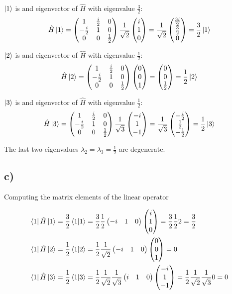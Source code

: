 \documentclass{article}
\newcommand*\colvec[3][]{
    \begin{pmatrix}\ifx\relax#1\relax\else#1\\\fi#2\\#3\end{pmatrix}
}
\begin{document}
$\ket{1}$ is and eigenvector of $\hat{H}$ with eigenvalue $\frac{3}{2}$:
\begin{equation}
\hat{H}\ket{1} = 
\begin{pmatrix}
1 & \frac{i}{2} & 0 \\
-\frac{i}{2} & 1 & 0 \\
0 & 0 & \frac{1}{2}
\end{pmatrix}
\frac{1}{\sqrt{2}}\colvec[i]{1}{0} =
\frac{1}{\sqrt{2}}\colvec[\frac{3i}{2}]{\frac{3}{2}}{0} =
\frac{3}{2}\ket{1}
\end{equation}

$\ket{2}$ is and eigenvector of $\hat{H}$ with eigenvalue $\frac{1}{2}$:
\begin{equation}
\hat{H}\ket{2} = 
\begin{pmatrix}
1 & \frac{i}{2} & 0 \\
-\frac{i}{2} & 1 & 0 \\
0 & 0 & \frac{1}{2}
\end{pmatrix}
\colvec[0]{0}{1} =
\colvec[0]{0}{\frac{1}{2}} =
\frac{1}{2}\ket{2}
\end{equation}

$\ket{3}$ is and eigenvector of $\hat{H}$ with eigenvalue $\frac{1}{2}$:
\begin{equation}
\hat{H}\ket{3} = 
\begin{pmatrix}
1 & \frac{i}{2} & 0 \\
-\frac{i}{2} & 1 & 0 \\
0 & 0 & \frac{1}{2}
\end{pmatrix}
\frac{1}{\sqrt{3}}\colvec[-i]{1}{-1} =
\frac{1}{\sqrt{3}}\colvec[-\frac{i}{2}]{\frac{1}{2}}{-\frac{1}{2}} =
\frac{1}{2}\ket{3}
\end{equation}

The last two eigenvalues $\lambda_2 = \lambda_3 = \frac{1}{2}$ are degenerate.

\subsection*{c)}

Computing the matrix elements of the linear operator

\begin{align}
\bra{1}\hat{H}\ket{1} &= \frac{3}{2}\braket{1} 
=\frac{3}{2}\frac{1}{2}\begin{pmatrix} -i & 1 &
  0 \end{pmatrix}\colvec[i]{1}{0}
=\frac{3}{2}\frac{1}{2}2=\frac{3}{2}
\\
\bra{1}\hat{H}\ket{2} &= \frac{1}{2}\braket{1}{2} 
=\frac{1}{2}\frac{1}{\sqrt{2}}\begin{pmatrix} -i & 1 &
  0 \end{pmatrix}\colvec[0]{0}{1}
=0
\\
\bra{1}\hat{H}\ket{3} &= \frac{1}{2}\braket{1}{3} 
=\frac{1}{2}\frac{1}{\sqrt{2}}\frac{1}{\sqrt{3}}\begin{pmatrix} i & 1 &
  0 \end{pmatrix}\colvec[-i]{1}{-1}
= \frac{1}{2}\frac{1}{\sqrt{2}}\frac{1}{\sqrt{3}}0=0
\end{align}
\end{document}
